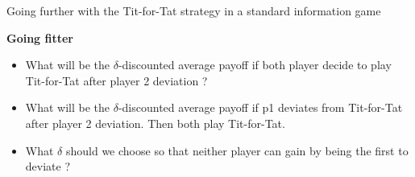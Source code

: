\begin{frame}{Going further with the Tit-for-Tat strategy in a standard information game}
	
	\textbf{Going fitter}
	\begin{itemize}
	\item What will be the $\delta$-discounted average payoff if both player decide to play Tit-for-Tat after player 2 deviation ?
	\pause
	
	\item What will be the $\delta$-discounted average payoff if p1 deviates from Tit-for-Tat after player 2 deviation. Then both play Tit-for-Tat.
	\pause
	\item What $\delta$ should we choose so that neither player can gain by being the first to deviate ?
	\end{itemize}
\end{frame}


